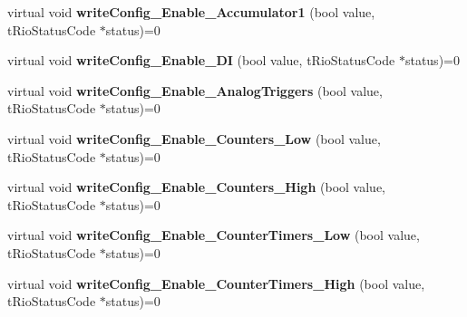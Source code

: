 \begin{DoxyCompactItemize}
\item 
\hypertarget{classnFPGA_1_1nFRC__2012__1__6__4_1_1tDMA_a2e5c38a4be177756ff6c3c9cd79457a7}{
virtual void {\bfseries writeConfig\_\-Enable\_\-Accumulator1} (bool value, tRioStatusCode $\ast$status)=0}
\label{classnFPGA_1_1nFRC__2012__1__6__4_1_1tDMA_a2e5c38a4be177756ff6c3c9cd79457a7}

\item 
\hypertarget{classnFPGA_1_1nFRC__2012__1__6__4_1_1tDMA_aa458ab464e9376b2e98a9309f48e6f7d}{
virtual void {\bfseries writeConfig\_\-Enable\_\-DI} (bool value, tRioStatusCode $\ast$status)=0}
\label{classnFPGA_1_1nFRC__2012__1__6__4_1_1tDMA_aa458ab464e9376b2e98a9309f48e6f7d}

\item 
\hypertarget{classnFPGA_1_1nFRC__2012__1__6__4_1_1tDMA_afc2f46132af910fb4200b3b344d6bb04}{
virtual void {\bfseries writeConfig\_\-Enable\_\-AnalogTriggers} (bool value, tRioStatusCode $\ast$status)=0}
\label{classnFPGA_1_1nFRC__2012__1__6__4_1_1tDMA_afc2f46132af910fb4200b3b344d6bb04}

\item 
\hypertarget{classnFPGA_1_1nFRC__2012__1__6__4_1_1tDMA_ab8bbba14b63f3771343b6e8b5c88905b}{
virtual void {\bfseries writeConfig\_\-Enable\_\-Counters\_\-Low} (bool value, tRioStatusCode $\ast$status)=0}
\label{classnFPGA_1_1nFRC__2012__1__6__4_1_1tDMA_ab8bbba14b63f3771343b6e8b5c88905b}

\item 
\hypertarget{classnFPGA_1_1nFRC__2012__1__6__4_1_1tDMA_a5ff7d240e7a5404d6cca642902c735a4}{
virtual void {\bfseries writeConfig\_\-Enable\_\-Counters\_\-High} (bool value, tRioStatusCode $\ast$status)=0}
\label{classnFPGA_1_1nFRC__2012__1__6__4_1_1tDMA_a5ff7d240e7a5404d6cca642902c735a4}

\item 
\hypertarget{classnFPGA_1_1nFRC__2012__1__6__4_1_1tDMA_aab35d0b4aa8cfeb9fc2de1bdbbd17277}{
virtual void {\bfseries writeConfig\_\-Enable\_\-CounterTimers\_\-Low} (bool value, tRioStatusCode $\ast$status)=0}
\label{classnFPGA_1_1nFRC__2012__1__6__4_1_1tDMA_aab35d0b4aa8cfeb9fc2de1bdbbd17277}

\item 
\hypertarget{classnFPGA_1_1nFRC__2012__1__6__4_1_1tDMA_a4a38c5ce37e8b88dc16a42b8b275f058}{
virtual void {\bfseries writeConfig\_\-Enable\_\-CounterTimers\_\-High} (bool value, tRioStatusCode $\ast$status)=0}
\label{classnFPGA_1_1nFRC__2012__1__6__4_1_1tDMA_a4a38c5ce37e8b88dc16a42b8b275f058}


\end{DoxyCompactItemize}
